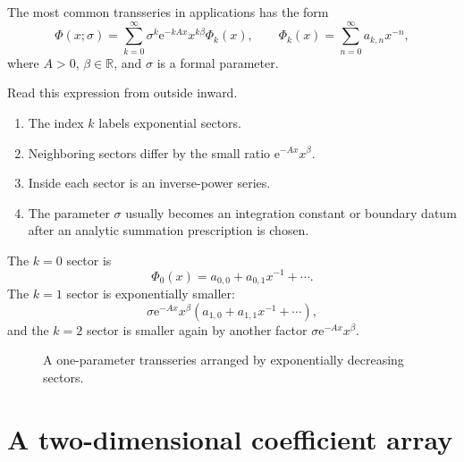 \documentclass[11pt,oneside]{book}
\theoremstyle{definition}
\theoremstyle{remark}
\newcommand{\R}{\mathbb{R}}
\newcommand{\e}{\mathrm{e}}
\newcommand{\sector}[1]{\Phi_{#1}}
\begin{document}
The most common transseries in applications has the form
\begin{equation}
  \Phi(x;\sigma)
  =\sum_{k=0}^{\infty}
     \sigma^k\e^{-kAx}x^{k\beta}\sector{k}(x),
  \qquad
  \sector{k}(x)=\sum_{n=0}^{\infty}a_{k,n}x^{-n},
  \label{eq:one-parameter-transseries}
\end{equation}
where $A>0$, $\beta\in\R$, and $\sigma$ is a formal parameter.

Read this expression from outside inward.

\begin{enumerate}
\item The index $k$ labels exponential sectors.
\item Neighboring sectors differ by the small ratio
      $\e^{-Ax}x^\beta$.
\item Inside each sector is an inverse-power series.
\item The parameter $\sigma$ usually becomes an integration constant or boundary
      datum after an analytic summation prescription is chosen.
\end{enumerate}

The $k=0$ sector is
\[
  \sector{0}(x)=a_{0,0}+a_{0,1}x^{-1}+\cdots.
\]
The $k=1$ sector is exponentially smaller:
\[
  \sigma\e^{-Ax}x^\beta
  \left(a_{1,0}+a_{1,1}x^{-1}+\cdots\right),
\]
and the $k=2$ sector is smaller again by another factor
$\sigma\e^{-Ax}x^\beta$.

\begin{figure}[ht]
\centering
{}
\caption{A one-parameter transseries arranged by exponentially decreasing sectors.}
\label{fig:sector-chain}
\end{figure}

\section{A two-dimensional coefficient array}
\end{document}
